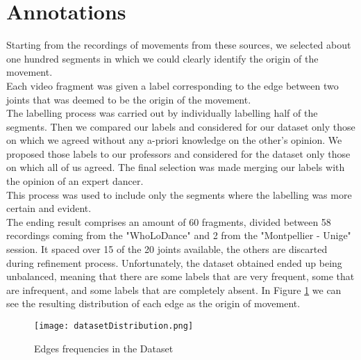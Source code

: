 \section{Annotations}
\label{sec:annotations}
Starting from the recordings of movements from these sources, we selected about one hundred segments in which we could clearly identify the origin of the movement.\\
Each video fragment was given a label corresponding to the edge between two joints that was deemed to be the origin of the movement.\\
The labelling process was carried out by individually labelling half of the segments. Then we compared our labels and considered for our dataset only those on which we agreed without any a-priori knowledge on the other's opinion.
We proposed those labels to our professors and considered for the dataset only those on which all of us agreed.
The final selection was made merging our labels with the opinion of an expert dancer.\\
This process was used to include only the segments where the labelling was more certain and evident.\\ 

The ending result comprises an amount of 60 fragments, divided between 58 recordings coming from the "WhoLoDance" and 2 from the "Montpellier - Unige" session. 
It spaced over 15 of the 20 joints available, the others are discarted during refinement process.
Unfortunately, the dataset obtained ended up being unbalanced, meaning that there are some labels that are very frequent, some that are infrequent, and some labels that are completely absent.
In Figure \ref{fig:dataset_distribution} we can see the resulting distribution of each edge as the origin of movement.\\

\begin{figure}[H]
    \centering
    \texttt{[image: datasetDistribution.png]}
    \caption{Edges frequencies in the Dataset}
    \label{fig:dataset_distribution}
\end{figure}